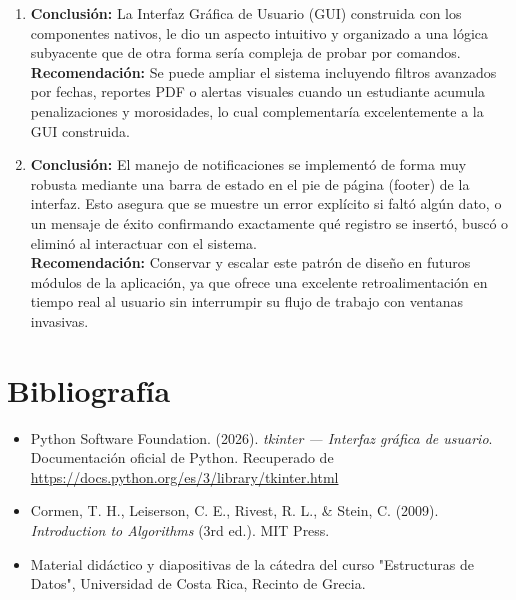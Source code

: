 \documentclass[11pt]{article}
\begin{document}
\begin{enumerate}
    \item \textbf{Conclusión:} La Interfaz Gráfica de Usuario (GUI) construida con los componentes nativos, le dio un aspecto intuitivo y organizado a una lógica subyacente que de otra forma sería compleja de probar por comandos.\\
    \textbf{Recomendación:} Se puede ampliar el sistema incluyendo filtros avanzados por fechas, reportes PDF o alertas visuales cuando un estudiante acumula penalizaciones y morosidades, lo cual complementaría excelentemente a la GUI construida.

    \item \textbf{Conclusión:} El manejo de notificaciones se implementó de forma muy robusta mediante una barra de estado en el pie de página (footer) de la interfaz. Esto asegura que se muestre un error explícito si faltó algún dato, o un mensaje de éxito confirmando exactamente qué registro se insertó, buscó o eliminó al interactuar con el sistema.\\
    \textbf{Recomendación:} Conservar y escalar este patrón de diseño en futuros módulos de la aplicación, ya que ofrece una excelente retroalimentación en tiempo real al usuario sin interrumpir su flujo de trabajo con ventanas invasivas.
\end{enumerate}

\section{Bibliografía}

\begin{itemize}
    \item Python Software Foundation. (2026). \textit{tkinter — Interfaz gráfica de usuario}. Documentación oficial de Python. Recuperado de \url{https://docs.python.org/es/3/library/tkinter.html}
    \item Cormen, T. H., Leiserson, C. E., Rivest, R. L., \& Stein, C. (2009). \textit{Introduction to Algorithms} (3rd ed.). MIT Press.
    \item Material didáctico y diapositivas de la cátedra del curso "Estructuras de Datos", Universidad de Costa Rica, Recinto de Grecia.
\end{itemize}
\end{document}
